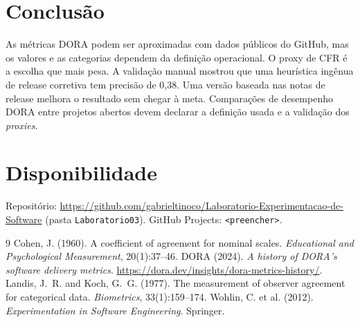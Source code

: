\documentclass[12pt]{article}
\begin{document}
\section{Conclusão}

As métricas DORA podem ser aproximadas com dados públicos do GitHub, mas os
valores e as categorias dependem da definição operacional. O proxy de CFR é a
escolha que mais pesa. A validação manual mostrou que uma heurística ingênua
de release corretiva tem precisão de 0,38. Uma versão baseada nas notas de
release melhora o resultado sem chegar à meta. Comparações de desempenho DORA
entre projetos abertos devem declarar a definição usada e a validação dos
\emph{proxies}.

\section*{Disponibilidade}

Repositório:
\url{https://github.com/gabrieltinoco/Laboratorio-Experimentacao-de-Software}
(pasta \texttt{Laboratorio03}).
GitHub Projects: \texttt{<preencher>}.


\begin{thebibliography}{9}
 Cohen, J. (1960). A coefficient of agreement for nominal
scales. \emph{Educational and Psychological Measurement}, 20(1):37--46.
 DORA (2024). \emph{A history of DORA's software delivery
metrics}. \url{https://dora.dev/insights/dora-metrics-history/}.
 Landis, J.~R. and Koch, G.~G. (1977). The measurement of
observer agreement for categorical data. \emph{Biometrics}, 33(1):159--174.
 Wohlin, C. et al. (2012). \emph{Experimentation in Software
Engineering}. Springer.
\end{thebibliography}
\end{document}
